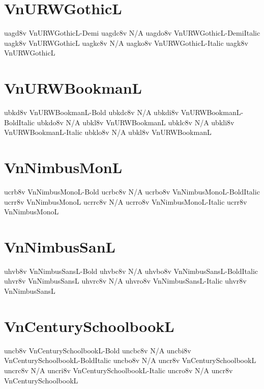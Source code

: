 \documentclass[sample]{vnsample}
\begin{document}
\section{VnURWGothicL}
  {uagd8v}  {VnURWGothicL-Demi}
 {uagdc8v} {N/A}
 {uagdo8v} {VnURWGothicL-DemiItalic}
   {uagk8v}  {VnURWGothicL}
  {uagkc8v} {N/A}
  {uagko8v} {VnURWGothicL-Italic}
   {uagk8v}  {VnURWGothicL}

\section{VnURWBookmanL}
  {ubkd8v}  {VnURWBookmanL-Bold}
 {ubkdc8v} {N/A}
 {ubkdi8v} {VnURWBookmanL-BoldItalic}
 {ubkdo8v} {N/A}
   {ubkl8v}  {VnURWBookmanL}
  {ubklc8v} {N/A}
  {ubkli8v} {VnURWBookmanL-Italic}
  {ubklo8v} {N/A}
   {ubkl8v}  {VnURWBookmanL}

\section{VnNimbusMonL}
   {ucrb8v}  {VnNimbusMonoL-Bold}
  {ucrbc8v} {N/A}
  {ucrbo8v} {VnNimbusMonoL-BoldItalic}
   {ucrr8v}  {VnNimbusMonoL}
  {ucrrc8v} {N/A}
  {ucrro8v} {VnNimbusMonoL-Italic}
   {ucrr8v}  {VnNimbusMonoL}

\section{VnNimbusSanL}
   {uhvb8v}  {VnNimbusSansL-Bold}
  {uhvbc8v} {N/A}
  {uhvbo8v} {VnNimbusSansL-BoldItalic}
   {uhvr8v}  {VnNimbusSansL}
  {uhvrc8v} {N/A}
  {uhvro8v} {VnNimbusSansL-Italic}
   {uhvr8v}  {VnNimbusSansL}

\section{VnCenturySchoolbookL}
   {uncb8v}  {VnCenturySchoolbookL-Bold}
  {uncbc8v} {N/A}
  {uncbi8v} {VnCenturySchoolbookL-BoldItalic}
  {uncbo8v} {N/A}
   {uncr8v}  {VnCenturySchoolbookL}
  {uncrc8v} {N/A}
  {uncri8v} {VnCenturySchoolbookL-Italic}
  {uncro8v} {N/A}
   {uncr8v}  {VnCenturySchoolbookL}
\end{document}
